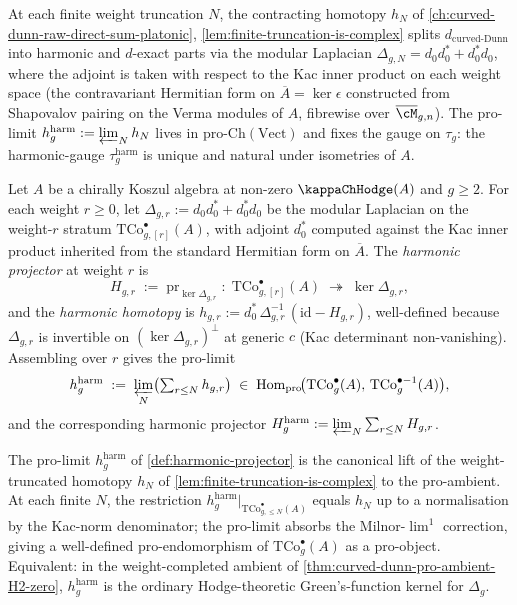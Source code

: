 At each finite weight truncation \(N\), the contracting homotopy
\(h_{N}\) of
\autoref{ch:curved-dunn-raw-direct-sum-platonic},
\autoref{lem:finite-truncation-is-complex} splits
\(d_{\mathrm{curved\text{-}Dunn}}\) into harmonic and
\(d\)-exact parts via the modular Laplacian
\(\Delta_{g, N} = d_{0} d_{0}^{\ast} + d_{0}^{\ast} d_{0}\), where
the adjoint is taken with respect to the Kac inner product on each
weight space (the contravariant Hermitian form on
\(\overline{A} = \ker \epsilon\) constructed from Shapovalov pairing
on the Verma modules of \(A\), fibrewise over
\(\overline{\cM}_{g,n}\)). The pro-limit
\(h^{\mathrm{harm}}_{g} := \varprojlim_{N} h_{N}\) lives in
\(\mathrm{pro\text{-}Ch}(\mathrm{Vect})\) and fixes the gauge on
\(\tau_{g}\): the harmonic-gauge
\(\tau_{g}^{\mathrm{harm}}\) is unique and natural under
isometries of \(A\).

\begin{definition}
\label{def:harmonic-projector}
Let \(A\) be a chirally Koszul algebra at non-zero \(\kappaChHodge(A)\)
and \(g \ge 2\). For each weight \(r \ge 0\), let
\(\Delta_{g, r} := d_{0} d_{0}^{\ast} + d_{0}^{\ast} d_{0}\) be the
modular Laplacian on the weight-\(r\) stratum
\(\mathrm{TCo}^{\bullet}_{g, [r]}(A)\), with adjoint
\(d_{0}^{\ast}\) computed against the Kac inner product inherited
from the standard Hermitian form on
\(\overline{A}\). The \emph{harmonic projector} at weight \(r\) is
\[
 H_{g, r} \;:=\; \mathrm{pr}_{\ker \Delta_{g, r}}
 \;:\; \mathrm{TCo}^{\bullet}_{g, [r]}(A)
 \;\twoheadrightarrow\; \ker \Delta_{g, r},
\]
and the \emph{harmonic homotopy} is
\(h_{g, r} := d_{0}^{\ast}\,\Delta_{g, r}^{-1}\,(\mathrm{id} - H_{g, r})\),
well-defined because \(\Delta_{g, r}\) is invertible on
\((\ker \Delta_{g, r})^{\perp}\) at generic \(c\) (Kac determinant
non-vanishing). Assembling over \(r\) gives the pro-limit
\[
 h^{\mathrm{harm}}_{g} \;:=\; \varprojlim_{N} \bigl(
 \textstyle\sum_{r \le N} h_{g, r}\bigr)
 \;\in\; \mathrm{Hom}_{\mathrm{pro}}\!\bigl(
 \mathrm{TCo}^{\bullet}_{g}(A),\,
 \mathrm{TCo}^{\bullet - 1}_{g}(A)\bigr),
\]
and the corresponding harmonic projector
\(H^{\mathrm{harm}}_{g} := \varprojlim_{N}
\sum_{r \le N} H_{g, r}\).
\end{definition}

\begin{remark}
\label{rem:harmonic-homotopy-truncation-identification}
The pro-limit \(h^{\mathrm{harm}}_{g}\) of
\autoref{def:harmonic-projector} is the canonical lift of the
weight-truncated homotopy \(h_{N}\) of
\autoref{lem:finite-truncation-is-complex} to the pro-ambient.
At each finite \(N\), the restriction
\(h^{\mathrm{harm}}_{g}|_{\mathrm{TCo}^{\bullet}_{g, \le N}(A)}\)
equals \(h_{N}\) up to a normalisation by the Kac-norm denominator;
the pro-limit absorbs the Milnor-\(\lim^{1}\) correction, giving a
well-defined pro-endomorphism of
\(\mathrm{TCo}^{\bullet}_{g}(A)\) as a pro-object.
Equivalent: in the weight-completed ambient of
\autoref{thm:curved-dunn-pro-ambient-H2-zero},
\(h^{\mathrm{harm}}_{g}\) is the ordinary Hodge-theoretic
Green's-function kernel for \(\Delta_{g}\).
\end{remark}

